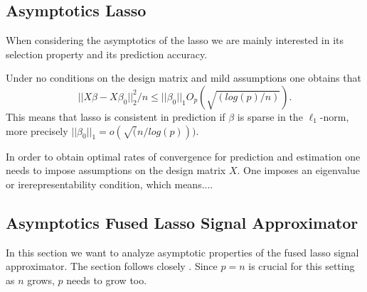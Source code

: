 \documentclass{article}
\theoremstyle{definition}
\begin{document}

\subsection{Asymptotics Lasso} 

When considering the asymptotics of the lasso we are mainly interested in its selection property and its prediction accuracy.

Under no conditions on the design matrix and mild assumptions one obtains that
\begin{equation}
	||X\hat{\beta}-X\beta_0||_2^2/n \leq ||\beta_0||_1 O_p(\sqrt{(log(p)/n)}).
\end{equation}
This means that lasso is consistent in prediction if $\beta$ is sparse in the $\ell_1$-norm, more precisely $||\beta_0||_1 = o(\sqrt(n/log(p)))$.

In order to obtain optimal rates of convergence for prediction and estimation one needs to impose assumptions on the design matrix $X$. One imposes an eigenvalue or irerepresentability condition, which means....
\subsection{Asymptotics Fused Lasso Signal Approximator}

In this section we want to analyze asymptotic properties of the fused lasso signal approximator. The section follows closely \citep{rinaldoproperties}. Since $p = n$ is crucial for this setting as $n$ grows, $p$ needs to grow too.
\end{document}
